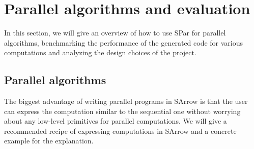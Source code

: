 

\chapter{Parallel algorithms and evaluation} \label{eval} \label{chap:eval}
In this section, we will give an overview of how to use SPar for parallel algorithms, benchmarking the performance of the generated code for various computations and analyzing the design choices of the project.
\section{Parallel algorithms}
The biggest advantage of writing parallel programs in SArrow is that the user can express the computation similar to the sequential one without worrying about any low-level primitives for parallel computations. We will give a recommended recipe of expressing computations in SArrow and a concrete example for the explanation.

